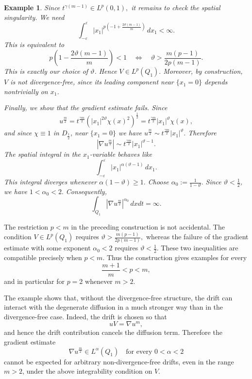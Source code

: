 \documentclass{amsart}
\newtheorem{example}[defn]{Example}
\numberwithin{equation}{section}
\begin{document}
\begin{example}
Since
\(
t^{\gamma(m-1)}\in L^p(0,1),
\)
it remains to check the spatial singularity. We need
\[
\int_{-\varepsilon}^{\varepsilon}
|x_1|^{p\left(-1+\frac{2\vartheta(m-1)}{m}\right)}
\,dx_1<\infty.
\]
This is equivalent to
\[
p\left(1-\frac{2\vartheta(m-1)}{m}\right)<1 \quad \iff \quad
\vartheta>
\frac{m(p-1)}{2p(m-1)}.
\]
This is exactly our choice of \(\vartheta\). Hence
\(
V\in L^p(Q_1).
\)
Moreover, by construction, \(V\) is not divergence-free, since its leading component near \(\{x_1=0\}\) depends nontrivially on \(x_1\). %

Finally, we show that the gradient estimate fails. Since
\[
u^{\frac{m}{2}}
=
t^{\frac{\gamma m}{2}}
\left(
|x_1|^{2\vartheta}\chi(x)^2
\right)^{\frac{1}{2}}
=
t^{\frac{\gamma m}{2}}
|x_1|^\vartheta\chi(x),
\]
and since \(\chi\equiv1\) in \(D_{\frac{1}{2}}\), near \(\{x_1=0\}\) we have
\(
u^{\frac{m}{2}}
\sim
t^{\frac{\gamma m}{2}}
|x_1|^\vartheta.
\)
Therefore
\[
\left|\nabla u^{\frac{m}{2}}\right|
\sim
t^{\frac{\gamma m}{2}}
|x_1|^{\vartheta-1}.
\]
The spatial integral in the \(x_1\)-variable behaves like
\[
\int_{-\varepsilon}^{\varepsilon}
|x_1|^{\alpha(\vartheta-1)}\,dx_1.
\]
This integral diverges whenever
\(
\alpha(1-\vartheta)\ge1.
\)
Choose
\(
\alpha_0:=\frac{1}{1-\vartheta}.
\)
Since \(\vartheta<\frac{1}{2}\), we have
\(
1<\alpha_0<2.
\)
Consequently,
\[
\int_{Q_1}
\left|\nabla u^{\frac{m}{2}}\right|^{\alpha_0}
\,dxdt
=
\infty.
\]
\end{example}




The restriction \(p<m\) in the preceding construction is not accidental.
The condition \(V\in L^p(Q_1)\) requires
\(
\vartheta>
\frac{m(p-1)}{2p(m-1)},
\)
whereas the failure of the gradient estimate with some exponent
\(\alpha_0<2\) requires
\(
\vartheta<\frac{1}{2}.
\)
These two inequalities are compatible precisely when \(p<m\). Thus the
construction gives examples for every
\[
\frac{m+1}{m}<p<m,
\]
and in particular for \(p=2\) whenever \(m>2\).

The example shows that, without the divergence-free structure, the drift can
interact with the degenerate diffusion in a much stronger way than in the
divergence-free case. Indeed, the drift is chosen so that
\[
uV=\nabla u^m,
\]
and hence the drift contribution cancels the diffusion term. Therefore the
gradient estimate
\[
\nabla u^{\frac{m}{2}}\in L^\alpha(Q_1)
\quad
\text{for every }0<\alpha<2
\]
cannot be expected for arbitrary non-divergence-free drifts, even in the
range \(m>2\), under the above integrability condition on \(V\).
\end{document}
